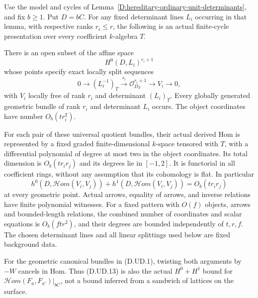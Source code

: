 \begin{proposition}
\label{D:hereditary-ordinary-unit-finite-cycle-Hom}
Use the model and cycles of
Lemma~\ref{D:hereditary-ordinary-unit-determinants}, and fix $b\ge1$.
Put $D=bC$. For any fixed determinant lines $L_i$ occurring in
that lemma, with respective ranks $r_i\le r$, the following is
an actual finite-cycle presentation over every coefficient
$k$-algebra $T$.

There is an open subset of the affine space
\[
                         H^0(D,L_i)^{r_i+1}             \tag{D.UD.11}
\]
whose points specify exact locally split sequences
\[
 0\longrightarrow (L_i^{-1})_T
   \xrightarrow{s_i}\mathcal O_{D_T}^{r_i+1}
   \longrightarrow V_i\longrightarrow0,              \tag{D.UD.12}
\]
with $V_i$ locally free of rank $r_i$ and determinant $(L_i)_T$.
Every globally generated geometric bundle of rank $r_i$ and
determinant $L_i$ occurs. The object coordinates have number
$O_b(tr_i^2)$.

For each pair of these universal quotient bundles, their actual
derived Hom is represented by a fixed graded finite-dimensional
$k$-space tensored with $T$, with a differential polynomial of
degree at most two in the object coordinates. Its total dimension
is $O_b(tr_ir_j)$ and its degrees lie in $[-1,2]$.
It is functorial in all coefficient rings, without any assumption
that its cohomology is flat. In particular
\[
 h^0(D,\mathcal Hom(V_i,V_j))+
 h^1(D,\mathcal Hom(V_i,V_j))=O_b(tr_ir_j)              \tag{D.UD.13}
\]
at every geometric point. Actual arrows, equality of arrows,
and inverse relations have finite polynomial witnesses. For a
fixed pattern with $O(f)$ objects, arrows and bounded-length
relations, the combined number of coordinates and scalar
equations is $O_b(ftr^2)$, and their degrees are bounded
independently of $t,r,f$. The chosen determinant lines and all
linear splittings used below are fixed background data.

For the geometric canonical bundles in (D.UD.1), twisting both
arguments by $-W$ cancels in Hom. Thus (D.UD.13) is also the
actual $H^0+H^1$ bound for
$\mathcal Hom(F_a,F_{a'})|_{bC}$, not a bound inferred from
a sandwich of lattices on the surface.
\end{proposition}

